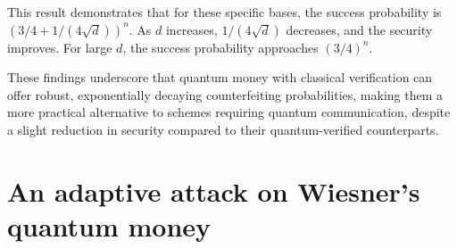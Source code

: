 \documentclass{article} %
\begin{document}
This result demonstrates that for these specific bases, the success probability is $(3/4 + 1/(4\sqrt{d}))^n$. As $d$ increases, $1/(4\sqrt{d})$ decreases, and the security improves. For large $d$, the success probability approaches $(3/4)^n$.

These findings underscore that quantum money with classical verification can offer robust, exponentially decaying counterfeiting probabilities, making them a more practical alternative to schemes requiring quantum communication, despite a slight reduction in security compared to their quantum-verified counterparts.










\color{black}
\newpage
\section{An adaptive attack on Wiesner’s quantum money}
\end{document}
